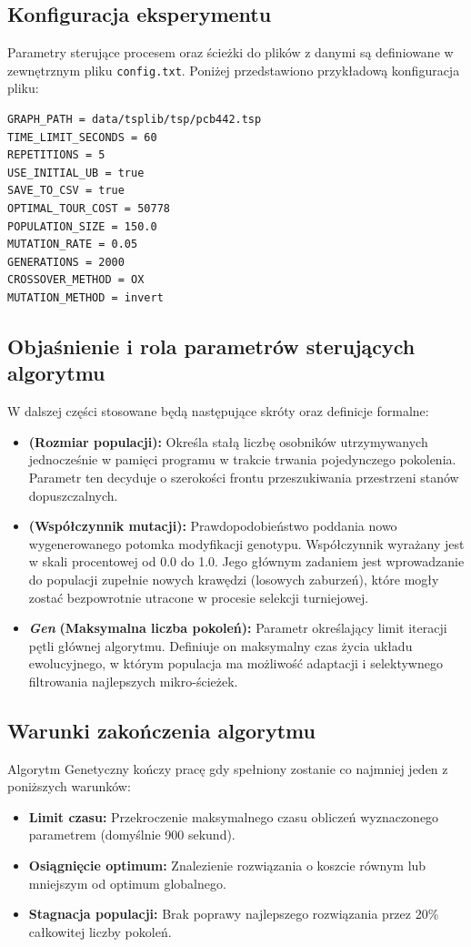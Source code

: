 \documentclass[conference]{IEEEtran}
\begin{document}
        \subsection{Konfiguracja eksperymentu}
        Parametry sterujące procesem oraz ścieżki do plików \linebreak z danymi są definiowane w zewnętrznym pliku \texttt{config.txt}. Poniżej przedstawiono przykładową konfiguracja pliku:
\begin{verbatim}
GRAPH_PATH = data/tsplib/tsp/pcb442.tsp
TIME_LIMIT_SECONDS = 60
REPETITIONS = 5
USE_INITIAL_UB = true
SAVE_TO_CSV = true
OPTIMAL_TOUR_COST = 50778
POPULATION_SIZE = 150.0
MUTATION_RATE = 0.05
GENERATIONS = 2000
CROSSOVER_METHOD = OX
MUTATION_METHOD = invert
\end{verbatim}
        \subsection{Objaśnienie i rola parametrów sterujących algorytmu}
            W dalszej części stosowane będą następujące skróty oraz definicje formalne:
            \begin{itemize}
                \item {} \textbf{(Rozmiar populacji):} Określa stałą liczbę osobników utrzymywanych jednocześnie w pamięci programu w trakcie trwania pojedynczego pokolenia. Parametr ten decyduje o szerokości frontu przeszukiwania przestrzeni stanów dopuszczalnych.
                \item {} \textbf{(Współczynnik mutacji):} Prawdopodobieństwo poddania nowo wygenerowanego potomka modyfikacji genotypu. Współczynnik wyrażany jest w skali procentowej od 0.0 do 1.0. Jego głównym zadaniem jest wprowadzanie do populacji zupełnie nowych krawędzi (losowych zaburzeń), które mogły zostać bezpowrotnie utracone \linebreak w procesie selekcji turniejowej.
                \item \textbf{\textit{Gen}} \textbf{(Maksymalna liczba pokoleń):} Parametr określający limit iteracji pętli głównej algorytmu. Definiuje on maksymalny czas życia układu ewolucyjnego, w którym populacja ma możliwość adaptacji i selektywnego filtrowania najlepszych mikro-ścieżek.
            \end{itemize}
        \subsection{Warunki zakończenia algorytmu}
            Algorytm Genetyczny kończy pracę gdy spełniony zostanie co najmniej jeden z poniższych warunków:
            \begin{itemize}
                \item \textbf{Limit czasu:} Przekroczenie maksymalnego czasu obliczeń wyznaczonego parametrem (domyślnie 900 sekund).
                \item \textbf{Osiągnięcie optimum:} Znalezienie rozwiązania o koszcie równym lub mniejszym od optimum globalnego.
                \item \textbf{Stagnacja populacji:} Brak poprawy najlepszego rozwiązania przez 20\% całkowitej liczby pokoleń.
            \end{itemize}
\end{document}
